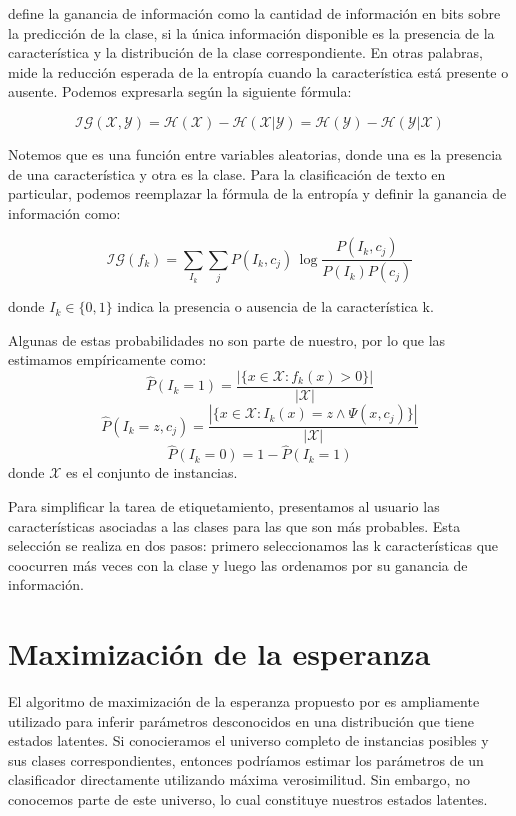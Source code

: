 \citet{infgain} define la ganancia de información como la cantidad de información en bits sobre la predicción de la clase, si la única información disponible es la presencia de la característica y la distribución de la clase correspondiente. En otras palabras, mide la reducción esperada de la entropía cuando la característica está presente o ausente. Podemos expresarla según la siguiente fórmula:

\begin{equation}
\mathcal{IG}(\mathcal{X}, \mathcal{Y}) = \mathcal{H}(\mathcal{X}) - \mathcal{H}(\mathcal{X}|\mathcal{Y}) = \mathcal{H}(\mathcal{Y}) - \mathcal{H}(\mathcal{Y}|\mathcal{X})
\end{equation}

Notemos que es una función entre variables aleatorias, donde una es la presencia de una característica y otra es la clase. Para la clasificación de texto en particular, podemos reemplazar la fórmula de la entropía y definir la ganancia de información como:

\begin{equation}
\mathcal{IG}(f_k) = \sum_{I_k} \sum_j P(I_k, c_j)\,\log \frac{P(I_k,c_j)}{P(I_k)P(c_j)}
\end{equation}

donde $I_k \in \{0, 1\}$ indica la presencia o ausencia de la característica k.

Algunas de estas probabilidades no son parte de nuestro, por lo que las estimamos empíricamente como:
$$ \hat{P}(I_k = 1) = \frac{|\{ x \in \mathcal{X}: f_k(x) > 0 \} |}{|\mathcal{X}|} $$
$$ \hat{P}(I_k = z, c_j) = \frac{|\{ x \in \mathcal{X}: I_k(x) = z \wedge \Psi(x, c_j)\} |}{|\mathcal{X}|} $$
$$ \hat{P}(I_k = 0) = 1 - \hat{P}(I_k = 1) $$
donde $\mathcal{X}$ es el conjunto de instancias.

Para simplificar la tarea de etiquetamiento, presentamos al usuario las características asociadas a las clases para las que son más probables. Esta selección se realiza en dos pasos: primero seleccionamos las k características que coocurren más veces con la clase y luego las ordenamos por su ganancia de información.

\section{Maximización de la esperanza}
El algoritmo de maximización de la esperanza propuesto por \citet{Dempster-maximumlikelihood} es ampliamente utilizado para inferir parámetros desconocidos en una distribución que tiene estados latentes. Si conocieramos el universo completo de instancias posibles y sus clases correspondientes, entonces podríamos estimar los parámetros de un clasificador directamente utilizando máxima verosimilitud. Sin embargo, no conocemos parte de este universo, lo cual constituye nuestros estados latentes.

